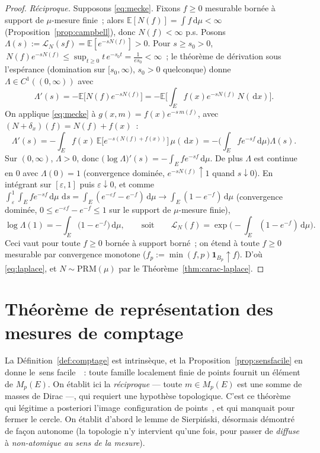\documentclass[11pt,a4paper]{article}
\providecommand{\og}{\guillemotleft\,}\providecommand{\fg}{\,\guillemotright}
\theoremstyle{plain}
\theoremstyle{definition}
\newcommand{\E}{\mathbb{E}}
\newcommand{\Mp}{M_p}
\newcommand{\one}{\mathbf{1}}
\newcommand{\dd}{\,\mathrm{d}}
\newcommand{\eps}{\varepsilon}
\newcommand{\calL}{\mathcal{L}}
\begin{document}
\begin{proof}
\emph{Réciproque.} Supposons \eqref{eq:mecke}. Fixons $f\ge0$ mesurable bornée à support de $\mu$-mesure finie~; alors $\E[N(f)]=\int f\dd\mu<\infty$ (Proposition~\ref{prop:campbell}), donc $N(f)<\infty$ p.s. Posons $\Lambda(s):=\calL_N(sf)=\E[e^{-sN(f)}]>0$. Pour $s\ge s_0>0$, $\,N(f)e^{-sN(f)}\le \sup_{t\ge0}t\,e^{-s_0 t}=\tfrac1{e s_0}<\infty$~; le théorème de dérivation sous l'espérance (domination sur $[s_0,\infty)$, $s_0>0$ quelconque) donne $\Lambda\in C^1((0,\infty))$ avec
\[
\Lambda'(s)=-\E\big[N(f)e^{-sN(f)}\big]=-\E\Big[\int_E f(x)e^{-sN(f)}\,N(\dd x)\Big].
\]
On applique \eqref{eq:mecke} à $g(x,m)=f(x)e^{-s\,m(f)}$, avec $(N+\delta_x)(f)=N(f)+f(x)$~:
\[
\Lambda'(s)=-\int_E f(x)\,\E\big[e^{-s(N(f)+f(x))}\big]\,\mu(\dd x)
=-\Big(\int_E f e^{-sf}\dd\mu\Big)\Lambda(s).
\]
Sur $(0,\infty)$, $\Lambda>0$, donc $\big(\log\Lambda\big)'(s)=-\int_E f e^{-sf}\dd\mu$. De plus $\Lambda$ est continue en $0$ avec $\Lambda(0)=1$ (convergence dominée, $e^{-sN(f)}\uparrow 1$ quand $s\downarrow0$). En intégrant sur $[\eps,1]$ puis $\eps\downarrow0$, et comme $\int_\eps^1\!\!\int_E f e^{-sf}\dd\mu\,\dd s=\int_E(e^{-\eps f}-e^{-f})\dd\mu\to\int_E(1-e^{-f})\dd\mu$ (convergence dominée, $0\le e^{-\eps f}-e^{-f}\le1$ sur le support de $\mu$-mesure finie),
\[
\log\Lambda(1)=-\int_E\big(1-e^{-f}\big)\dd\mu,
\qquad\text{soit}\qquad
\calL_N(f)=\exp\Big(-\int_E(1-e^{-f})\dd\mu\Big).
\]
Ceci vaut pour toute $f\ge0$ bornée à support borné~; on étend à toute $f\ge0$ mesurable par convergence monotone ($f_p:=\min(f,p)\one_{B_p}\uparrow f$). D'où \eqref{eq:laplace}, et $N\sim\mathrm{PRM}(\mu)$ par le Théorème~\ref{thm:carac-laplace}.
\end{proof}

\section{Théorème de représentation des mesures de comptage}\label{sec:representation}

La Définition~\ref{def:comptage} est intrinsèque, et la Proposition~\ref{prop:sensfacile} en donne le \og sens facile \fg{}~: toute famille localement finie de points fournit un élément de $\Mp(E)$. On établit ici la \emph{réciproque} --- toute $m\in\Mp(E)$ est une somme de masses de Dirac ---, qui requiert une hypothèse topologique. C'est ce théorème qui légitime a posteriori l'image \og configuration de points \fg{}, et qui manquait pour fermer le cercle. On établit d'abord le lemme de Sierpiński, désormais démontré de façon autonome (la topologie n'y intervient qu'une fois, pour passer de \emph{diffuse} à \emph{non-atomique au sens de la mesure}).
\end{document}
